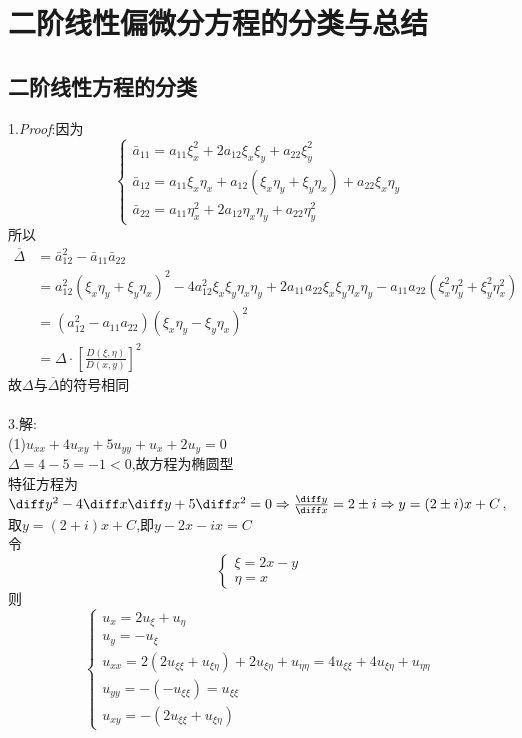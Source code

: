 \chapter{二阶线性偏微分方程的分类与总结}

\section{二阶线性方程的分类}

1.\textit{Proof}:因为
\[\begin{cases}
\bar{a}_{11}=a_{11}\xi_x^2+2a_{12}\xi_x\xi_y+a_{22}\xi_y^2\\
\bar{a}_{12}=a_{11}\xi_x\eta_x+a_{12}(\xi_x\eta_y+\xi_y\eta_x)+a_{22}\xi_x\eta_y\\
\bar{a}_{22}=a_{11}\eta_x^2+2a_{12}\eta_x\eta_y+a_{22}\eta_y^2
\end{cases}\]
所以
\[\begin{split}\overline{\Delta}&=\bar{a}_{12}^2-\bar{a}_{11}\bar{a}_{22}\\
&=a_{12}^2(\xi_x\eta_y+\xi_y\eta_x)^2-4a_{12}^2\xi_x\xi_y\eta_x\eta_y+2a_{11}a_{22}\xi_x\xi_y\eta_x\eta_y-a_{11}a_{22}(\xi_x^2\eta_y^2+\xi_y^2\eta_x^2)\\
&=(a_{12}^2-a_{11}a_{22})(\xi_x\eta_y-\xi_y\eta_x)^2\\
&=\Delta\cdot\left[\frac{D(\xi,\eta)}{D(x,y)}\right]^2
\end{split}\]
故$\Delta$与$\overline{\Delta}$的符号相同\\\\
3.解:\\
(1)$u_{xx}+4u_{xy}+5u_{yy}+u_x+2u_y=0$\\
$\Delta=4-5=-1<0$,故方程为椭圆型\\
特征方程为$\diff y^2-4\diff x\diff y+5\diff x^2=0\Rightarrow\frac{\diff y}{\diff x}=2\pm i\Rightarrow y=(2\pm i)x+C$,取$y=(2+i)x+C$,即$y-2x-ix=C$\\
令\[\begin{cases}
\xi=2x-y\\\eta=x
\end{cases}\]
则\[\begin{cases}
u_x=2u_{\xi}+u_{\eta}\\
u_y=-u_{\xi}\\
u_{xx}=2(2u_{\xi\xi}+u_{\xi\eta})+2u_{\xi\eta}+u_{\eta\eta}=4u_{\xi\xi}+4u_{\xi\eta}+u_{\eta\eta}\\
u_{yy}=-(-u_{\xi\xi})=u_{\xi\xi}\\
u_{xy}=-(2u_{\xi\xi}+u_{\xi\eta})
\end{cases}\]
